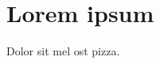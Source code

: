 \documentclass{article}
\begin{document}
\section{Lorem ipsum}
Dolor sit mel ost pizza.
\end{document}
